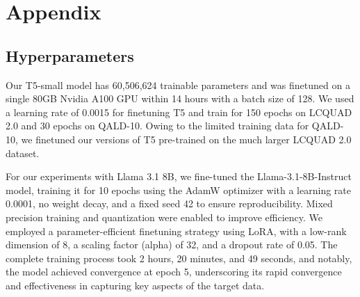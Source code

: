 \appendix

\section{Appendix}
\label{sec:appendix}

\subsection{Hyperparameters}
\label{sec:hyperparameters}

Our T5-small model has 60,506,624 trainable parameters and was finetuned on a single 80GB Nvidia A100 GPU within 14 hours with a batch size of 128.
We used a learning rate of 0.0015 for finetuning T5 and train for 150 epochs on LCQUAD 2.0 and 30 epochs on QALD-10. Owing to the limited training data for QALD-10, we finetuned our versions of T5 pre-trained on the much larger LCQUAD 2.0 dataset. 

For our experiments with Llama 3.1 8B, we fine-tuned the Llama-3.1-8B-Instruct model, training it for 10 epochs using the AdamW optimizer with a learning rate 0.0001, no weight decay, and a fixed seed 42 to ensure reproducibility. Mixed precision training and quantization were enabled to improve efficiency. We employed a parameter-efficient finetuning strategy using LoRA, with a low-rank dimension of 8, a scaling factor (alpha) of 32, and a dropout rate of 0.05. The complete training process took 2 hours, 20 minutes, and 49 seconds, and notably, the model achieved convergence at epoch 5, underscoring its rapid convergence and effectiveness in capturing key aspects of the target data.
